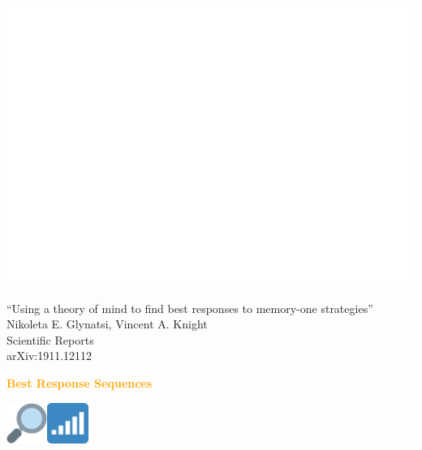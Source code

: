 \documentclass{beamer}
\begin{document}
\begin{frame}
    \begin{center}
    
    \end{center}
\end{frame}

\begin{frame}
    \begin{center}
    \includegraphics[width=.8\textwidth]{static/mem_one_against_longer_memory.png}
    \end{center}
\end{frame}

\begin{frame}
    \begin{center}
        \large{``Using a theory of mind to find best responses to memory-one strategies''} \\ \vspace{.5cm}
        \footnotesize{Nikoleta E. Glynatsi, Vincent A. Knight} \\ \vspace{.5cm}
        \footnotesize{Scientific Reports} \\ \vspace{.5cm}
        \footnotesize{arXiv:1911.12112}
    \end{center}
\end{frame}

\begin{frame}
    \begin{center}
    \textcolor{orange}{\large{\textbf{Best Response Sequences}}} \vspace{1cm}

    \includegraphics[width=0.10\textwidth]{static/look.png}\hspace{2pt}\includegraphics[width=0.10\textwidth]{static/sequence.png}
    \end{center}
\end{frame}
\end{document}
